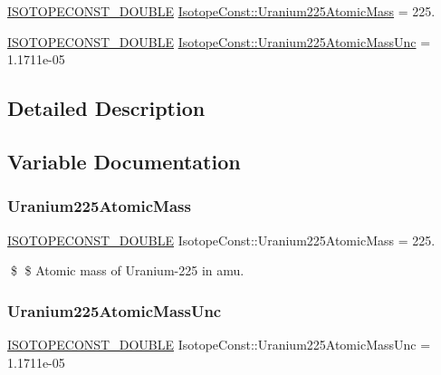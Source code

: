 \begin{DoxyCompactItemize}
\item 
\mbox{\hyperlink{group___isotope_const-_macros_ga8f45a7272ce02c0b4c65c44636ed719a}{I\+S\+O\+T\+O\+P\+E\+C\+O\+N\+S\+T\+\_\+\+D\+O\+U\+B\+LE}} \mbox{\hyperlink{group___isotope_const-_uranium-_u225_gaa1dfde8eab158ea8c2b6758aa59c15ae}{Isotope\+Const\+::\+Uranium225\+Atomic\+Mass}} = 225.
\item 
\mbox{\hyperlink{group___isotope_const-_macros_ga8f45a7272ce02c0b4c65c44636ed719a}{I\+S\+O\+T\+O\+P\+E\+C\+O\+N\+S\+T\+\_\+\+D\+O\+U\+B\+LE}} \mbox{\hyperlink{group___isotope_const-_uranium-_u225_gab21aefc49d5e3adde9bc8c329889236e}{Isotope\+Const\+::\+Uranium225\+Atomic\+Mass\+Unc}} = 1.\+1711e-\/05
\end{DoxyCompactItemize}


\subsection{Detailed Description}


\subsection{Variable Documentation}
\mbox{\label{group___isotope_const-_uranium-_u225_gaa1dfde8eab158ea8c2b6758aa59c15ae}} 
\subsubsection{\texorpdfstring{Uranium225\+Atomic\+Mass}{Uranium225AtomicMass}}
{\footnotesize\ttfamily \mbox{\hyperlink{group___isotope_const-_macros_ga8f45a7272ce02c0b4c65c44636ed719a}{I\+S\+O\+T\+O\+P\+E\+C\+O\+N\+S\+T\+\_\+\+D\+O\+U\+B\+LE}} Isotope\+Const\+::\+Uranium225\+Atomic\+Mass = 225.}

\$ \$ Atomic mass of Uranium-\/225 in amu. \mbox{\label{group___isotope_const-_uranium-_u225_gab21aefc49d5e3adde9bc8c329889236e}} 
\subsubsection{\texorpdfstring{Uranium225\+Atomic\+Mass\+Unc}{Uranium225AtomicMassUnc}}
{\footnotesize\ttfamily \mbox{\hyperlink{group___isotope_const-_macros_ga8f45a7272ce02c0b4c65c44636ed719a}{I\+S\+O\+T\+O\+P\+E\+C\+O\+N\+S\+T\+\_\+\+D\+O\+U\+B\+LE}} Isotope\+Const\+::\+Uranium225\+Atomic\+Mass\+Unc = 1.\+1711e-\/05}

